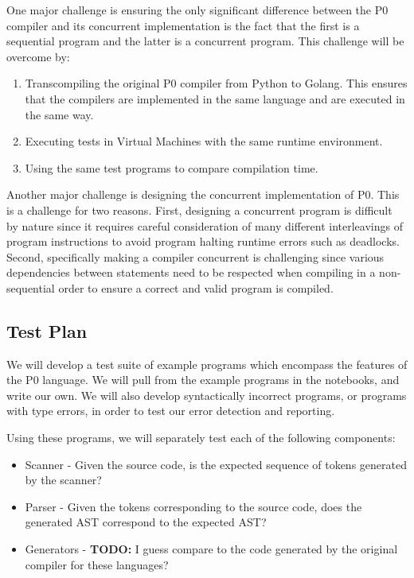 \documentclass{article}
\begin{document}
One major challenge is ensuring the only significant difference between the P0 compiler
and its concurrent implementation is the fact that the first is a sequential program and the
latter is a concurrent program. This challenge will be overcome by:
\begin{enumerate}
	\item Transcompiling the original P0 compiler from Python to Golang. This ensures that the
	compilers are implemented in the same language and are executed in the same way.
	\item Executing tests in Virtual Machines with the same runtime environment.
	\item Using the same test programs to compare compilation time.
\end{enumerate}
Another major challenge is designing the concurrent implementation of P0. This is a challenge
for two reasons. First, designing a concurrent program is difficult by nature since it requires 
careful consideration of many different interleavings of program instructions to avoid program
halting runtime errors such as deadlocks. Second, specifically making a compiler concurrent is
challenging since various dependencies between statements need to be respected when compiling
in a non-sequential order to ensure a correct and valid program is compiled.

\subsection{Test Plan} %

We will develop a test suite of example programs which encompass the features of
the P0 language. We will pull from the example programs in the notebooks, and
write our own.
We will also develop syntactically incorrect programs, or programs with type
errors, in order to test our error detection and reporting.

Using these programs, we will separately test each of the following components:

\begin{itemize}
  \item Scanner - Given the source code, is the expected sequence of tokens
    generated by the scanner?
  \item Parser - Given the tokens corresponding to the source code, does the
    generated AST correspond to the expected AST?
  \item Generators - \textbf{TODO:} I guess compare to the code generated by the
    original compiler for these languages?
\end{itemize}
\end{document}
